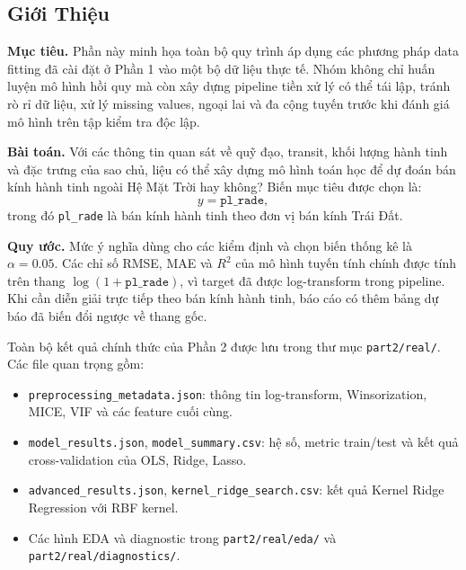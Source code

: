 ﻿\subsection{Giới Thiệu}

\textbf{Mục tiêu.} Phần này minh họa toàn bộ quy trình áp dụng các phương pháp data fitting đã
cài đặt ở Phần 1 vào một bộ dữ liệu thực tế. Nhóm không chỉ huấn luyện mô hình hồi quy mà còn xây
dựng pipeline tiền xử lý có thể tái lập, tránh rò rỉ dữ liệu, xử lý missing values, ngoại lai và
đa cộng tuyến trước khi đánh giá mô hình trên tập kiểm tra độc lập.

\textbf{Bài toán.} Với các thông tin quan sát về quỹ đạo, transit, khối lượng hành tinh và đặc
trưng của sao chủ, liệu có thể xây dựng mô hình toán học để dự đoán bán kính hành tinh ngoài Hệ
Mặt Trời hay không? Biến mục tiêu được chọn là:
\begin{equation}
    y = \texttt{pl\_rade},
\end{equation}
trong đó \texttt{pl\_rade} là bán kính hành tinh theo đơn vị bán kính Trái Đất.

\textbf{Quy ước.} Mức ý nghĩa dùng cho các kiểm định và chọn biến thống kê là
$\alpha = 0.05$. Các chỉ số RMSE, MAE và $R^2$ của mô hình tuyến tính chính được tính trên thang
$\log(1+\texttt{pl\_rade})$, vì target đã được log-transform trong pipeline. Khi cần diễn giải
trực tiếp theo bán kính hành tinh, báo cáo có thêm bảng dự báo đã biến đổi ngược về thang gốc.

Toàn bộ kết quả chính thức của Phần 2 được lưu trong thư mục \texttt{part2/real/}. Các file quan
trọng gồm:
\begin{itemize}
    \item \texttt{preprocessing\_metadata.json}: thông tin log-transform, Winsorization, MICE,
          VIF và các feature cuối cùng.
    \item \texttt{model\_results.json}, \texttt{model\_summary.csv}: hệ số, metric train/test và
          kết quả cross-validation của OLS, Ridge, Lasso.
    \item \texttt{advanced\_results.json}, \texttt{kernel\_ridge\_search.csv}: kết quả Kernel
          Ridge Regression với RBF kernel.
    \item Các hình EDA và diagnostic trong \texttt{part2/real/eda/} và
          \texttt{part2/real/diagnostics/}.
\end{itemize}


